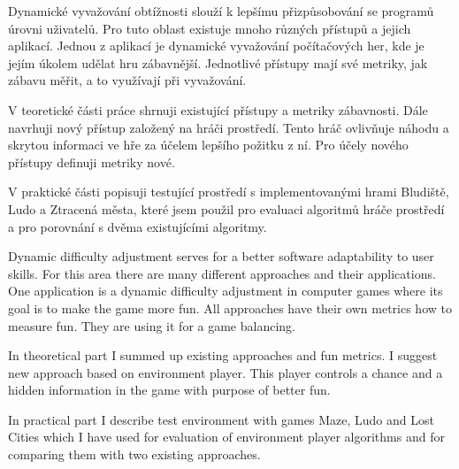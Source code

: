 \startAbstractCz
  Dynamické vyvažování obtížnosti slouží k lepšímu přizpůsobování se programů úrovni uživatelů. Pro tuto oblast existuje mnoho různých přístupů a jejich aplikací. Jednou z aplikací je dynamické vyvažování počítačových her, kde je jejím úkolem udělat hru zábavnější. Jednotlivé přístupy mají své metriky, jak zábavu měřit, a to využívají při vyvažování.
	
V teoretické části práce shrnuji existující přístupy a metriky zábavnosti. Dále navrhuji nový přístup založený na hráči prostředí. Tento hráč ovlivňuje náhodu a skrytou informaci ve hře za účelem lepšího požitku z ní. Pro účely nového přístupy definuji metriky nové.

V praktické části popisuji testující prostředí s implementovanými hrami Bludiště, Ludo a Ztracená města, které jsem použil pro evaluaci algoritmů hráče prostředí a pro porovnání s dvěma existujícími algoritmy.
\stopAbstractCz

\startAbstractEn
Dynamic difficulty adjustment serves for a better software adaptability to user skills. For this area there are many different approaches and their applications. One application is a dynamic difficulty adjustment in computer games where its goal is to make the game more fun. All approaches have their own metrics how to measure fun. They are using it for a game balancing.

In theoretical part I summed up existing approaches and fun metrics. I suggest new approach based on environment player. This player controls a chance and a hidden information in the game with purpose of better fun.

In practical part I describe test environment with games Maze, Ludo and Lost Cities which I have used for evaluation of environment player algorithms and for comparing them with two existing approaches. 
\stopAbstractEn

\endinput
